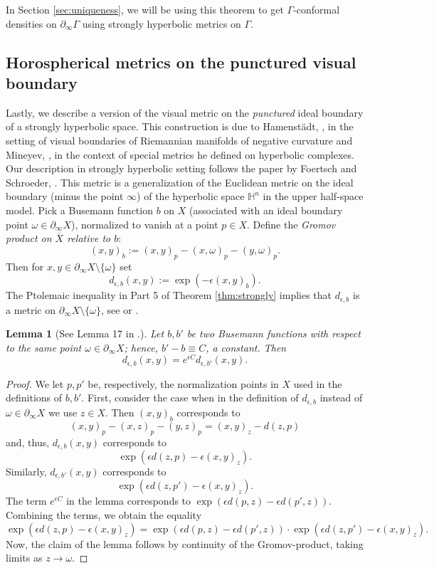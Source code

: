 \documentclass[12pt]{amsbook}%
\newtheorem{lem}[thm]{Lemma}
\theoremstyle{definition}
\theoremstyle{remark}
\numberwithin{section}{chapter}
\numberwithin{subsection}{section}
\numberwithin{figure}{chapter}
\def\eps{\epsilon}
\def\bH{{\mathbb{H}}}
\def\Ga{\Gamma}
\def\geo{\partial_\infty}
\def\ol{\overline}
\begin{document}
In Section \ref{sec:uniqueness}, we will be using this theorem to get $\Ga$-conformal densities on $\geo \Ga$ using strongly hyperbolic metrics on $\Ga$.  


\subsection{Horospherical metrics on the punctured visual boundary} 

Lastly, we describe a version of the visual metric on the {\em punctured} ideal boundary of a strongly hyperbolic space. This construction is due to Hamenst\"adt, 
\cite{Hamenstadt}, in the setting of visual boundaries of Riemannian manifolds of negative curvature and Mineyev, \cite{Mineyev}, in the context of special metrics he defined on 
hyperbolic complexes. Our description in strongly hyperbolic setting follows the paper by 
Foertsch and Schroeder, \cite{Foertsch-Schroeder}. This metric is a generalization of the Euclidean metric on the ideal boundary (minus the point $\infty$) 
of the hyperbolic space $\bH^n$ in the upper half-space model. Pick a Busemann function $b$ on $X$ (associated with 
an ideal boundary point $\omega\in \geo X$), normalized to vanish at a point $p\in X$. Define the {\em Gromov product on $\ol{X}$ relative to $b$}:
$$
(x,y)_b:= (x,y)_p - (x,\omega)_p - (y,\omega)_p. 
$$   
Then for $x, y\in \geo X \setminus \{\omega\}$ set
\begin{equation}\label{eq:boundary metric}
d_{\eps,b}(x,y):= \exp(-\eps (x,y)_b). 
\end{equation}
The Ptolemaic inequality in Part 5 of Theorem \ref{thm:strongly} implies that $d_{\eps,b}$ is a metric on $\geo X \setminus \{\omega\}$, see \cite{Mineyev} or 
\cite{Foertsch-Schroeder}. 

\begin{lem}
[See Lemma 17 in \cite{Mineyev}.]\label{lem:horo-rescale}
Let $b, b'$ be two Busemann functions with respect to the same point $\omega\in \geo X$; hence, $b'-b\equiv C$, a constant. Then
$$
d_{\eps,b}(x,y)= e^{\eps C} d_{\eps,b'}(x,y).
$$
\end{lem}
\begin{proof} We let $p, p'$ be, respectively, the normalization points in $X$ used in the definitions of $b, b'$. 
First, consider the case when in the definition of  $d_{\eps,b}$ instead of $\omega\in \geo X$ we use $z\in X$. Then $(x,y)_b$ corresponds 
to
$$
(x,y)_p - (x,z)_p - (y,z)_p= (x,y)_z - d(z,p) 
$$
and, thus, $d_{\eps,b}(x,y)$ corresponds to
$$
\exp(\eps d(z,p)  -\eps  (x,y)_z).  
$$
Similarly,  $d_{\eps,b'}(x,y)$ corresponds to
$$
\exp(\eps d(z,p')  -\eps  (x,y)_z).  
$$
The term $e^{\eps C}$ in the lemma corresponds to $\exp(\eps d(p,z) - \eps d(p',z))$. Combining the terms, we obtain the equality  
$$
\exp(\eps d(z,p)  -\eps  (x,y)_z)= \exp(\eps d(p,z) - \eps d(p',z)) \cdot \exp(\eps d(z,p')  -\eps  (x,y)_z).
$$
Now, the claim of the lemma follows by continuity of the Gromov-product, taking limits as $z\to \omega$.  
\end{proof}
\end{document}
